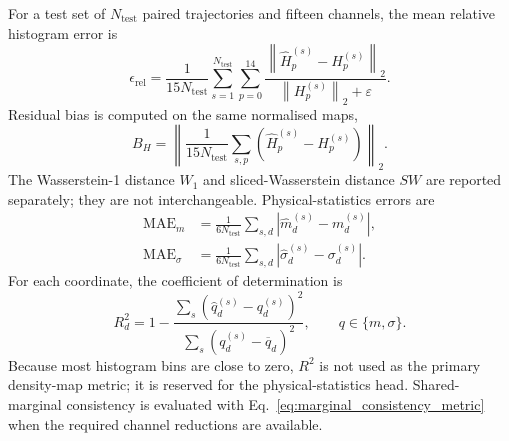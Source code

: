 For a test set of $N_{\mathrm{test}}$ paired trajectories and fifteen channels, the mean relative histogram error is
\begin{equation}
    \epsilon_{\mathrm{rel}}
    =
    \frac{1}{15N_{\mathrm{test}}}
    \sum_{s=1}^{N_{\mathrm{test}}}
    \sum_{p=0}^{14}
    \frac{
        \left\|\widehat{H}_{p}^{(s)}-H_{p}^{(s)}\right\|_2
    }{
        \left\|H_{p}^{(s)}\right\|_2+\varepsilon
    }.
    \label{eq:relative_histogram_metric}
\end{equation}
Residual bias is computed on the same normalised maps,
\begin{equation}
    B_H
    =
    \left\|
        \frac{1}{15N_{\mathrm{test}}}
        \sum_{s,p}
        \left(\widehat{H}_{p}^{(s)}-H_{p}^{(s)}\right)
    \right\|_2.
    \label{eq:histogram_bias_metric}
\end{equation}
The Wasserstein-1 distance $W_1$ and sliced-Wasserstein distance $SW$ are reported separately; they are not interchangeable. Physical-statistics errors are
\begin{align}
    \operatorname{MAE}_{m}
    &=
    \frac{1}{6N_{\mathrm{test}}}
    \sum_{s,d}
    \left|\widehat{m}_{d}^{(s)}-m_{d}^{(s)}\right|,
    \\
    \operatorname{MAE}_{\sigma}
    &=
    \frac{1}{6N_{\mathrm{test}}}
    \sum_{s,d}
    \left|\widehat{\sigma}_{d}^{(s)}-\sigma_{d}^{(s)}\right|.
\end{align}
For each coordinate, the coefficient of determination is
\begin{equation}
    R_d^2
    =
    1-
    \frac{
        \sum_s(\widehat{q}_{d}^{(s)}-q_{d}^{(s)})^2
    }{
        \sum_s(q_{d}^{(s)}-\overline{q}_d)^2
    },
    \qquad
    q\in\{m,\sigma\}.
    \label{eq:physics_r2_metric}
\end{equation}
Because most histogram bins are close to zero, $R^2$ is not used as the primary density-map metric; it is reserved for the physical-statistics head. Shared-marginal consistency is evaluated with Eq.~\eqref{eq:marginal_consistency_metric} when the required channel reductions are available.

